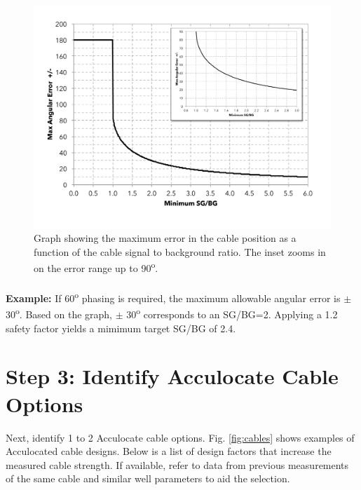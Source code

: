 \documentclass[paper=a4, fontsize=11pt]{scrartcl}
\numberwithin{equation}{section}		%
\numberwithin{figure}{section}			%
\numberwithin{table}{section}				%
\begin{document}
\begin{figure}[h!]
    \caption{Graph showing the maximum error in the cable position as a function of the cable signal to background ratio.  The inset zooms in on the error range up to 90\textsuperscript{o}.}
    \label{fig:max_error_graph}
    \centering
    \includegraphics[width=1.0\textwidth]{figures/max_error_vs_sgbg.pdf}
\end{figure}

\paragraph{}
\textbf{Example:} If 60\textsuperscript{o} phasing is required, the maximum allowable angular error is $\pm$ 30\textsuperscript{o}.  Based on the graph, $\pm$ 30\textsuperscript{o} corresponds to an SG/BG=2.  Applying a 1.2 safety factor yields a mimimum target SG/BG of 2.4.

\section{Step 3: Identify Acculocate Cable Options}
Next, identify 1 to 2 Acculocate cable options.  Fig. \ref{fig:cables} shows examples of Acculocated cable designs.  Below is a list of design factors that increase the measured cable strength.  If available, refer to data from previous measurements of the same cable and similar well parameters to aid the selection. 
\end{document}
